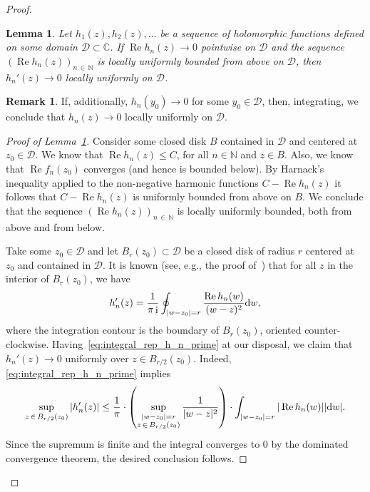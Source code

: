 \documentclass[10pt]{amsart}
\newtheorem{lemm}[theo]{Lemma}\newtheorem{prop}[theo]{Proposition}\newtheorem{coro}[theo]{Corollary}\newtheorem{conj}[theo]{Conjecture}
\theoremstyle{definition}\newtheorem{defi}[theo]{Definition}\newtheorem{rema}[theo]{Remark}\newtheorem{exam}[theo]{Example}\newtheorem{exem}[theo]{Example}\newtheorem{nota}[theo]{Notation}
\DeclareMathOperator{\Ree}{Re}
\DeclareMathOperator{\ii}{i}
\newcommand{\N}{\mathbb{N}}
\newcommand{\C}{\mathbb{C}}
\newcommand{\cD}{\mathcal{D}}
\newcommand*\dint{\text{\normalfont d}}
\begin{document}
\begin{proof}
\begin{lemm}\label{lem:differentiate_limit_real_parts}
Let $h_1(z), h_2(z),\ldots$ be a sequence of holomorphic functions defined on some domain $\cD\subset \C$. If $\Ree h_n(z) \to 0$ pointwise on $\cD$ and the sequence $(\Ree h_n(z))_{n\,\in\,\N}$ is locally uniformly bounded from above on $\cD$, then $h_n'(z) \to 0$ locally uniformly on $\cD$.
\end{lemm}

\begin{rema}\label{rem:lem:differentiate_real_parts}
If, additionally, $h_n(y_0) \to 0$ for some $y_0\in \cD$, then, integrating, we conclude that $h_n(z) \to 0$ locally uniformly on $\cD$.
\end{rema}
\begin{proof}[{Proof of Lemma~\ref{lem:differentiate_limit_real_parts}}]
Consider some closed disk $B$ contained in $\cD$ and centered at $z_0\in \cD$. We know that $\Ree h_n (z)\leq C$, for all $n\in \N$ and $z\in B$. Also, we know that $\Ree f_n (z_0)$ converges (and hence is bounded below). By Harnack's inequality applied to the non-negative harmonic functions $C - \Ree h_n(z)$ it follows that $C-\Ree h_n(z)$ is uniformly bounded from above on $B$. We conclude that the sequence $(\Ree h_n(z))_{n\,\in\,\N}$ is locally uniformly bounded, both from above and from below.

Take some $z_0\in \cD$ and let $B_r(z_0)\subset \cD$ be a closed disk of radius $r$ centered at $z_0$ and contained in $\cD$. It is known (see, e.g., the proof of~\cite[Lemma~3.8]{kabluchko_rep_diff_free_poi}) that for all $z$ in the interior of $B_r(z_0)$, we have
\begin{equation}\label{eq:integral_rep_h_n_prime}
h_n'(z) = \frac 1 {\pi \ii} \oint_{|w-z_0| = r} \frac{\Ree h_n(w)}{(w-z)^2} \dint w,
\end{equation}
where the integration contour is the boundary of $B_r(z_0)$, oriented counter-clockwise. Having~\eqref{eq:integral_rep_h_n_prime} at our disposal, we claim that $h_n'(z) \to 0$ uniformly over $z\in B_{r/2}(z_0)$. Indeed, \eqref{eq:integral_rep_h_n_prime} implies
\[
\sup_{z\,\in\,B_{r/2}(z_0)} |h_n'(z)| \leq \frac 1 {\pi} \cdot \left(\sup_{\substack{|w-z_0| = r\\ z\,\in\, B_{r/2}(z_0)}} \frac{1}{|w-z|^2} \right) \cdot \int_{|w-z_0| = r} |\Ree h_n(w)| |\dint w|.
\]
Since the supremum is finite and the integral converges to $0$ by the dominated convergence theorem, the desired conclusion follows.
\end{proof}


\end{proof}
\end{document}
